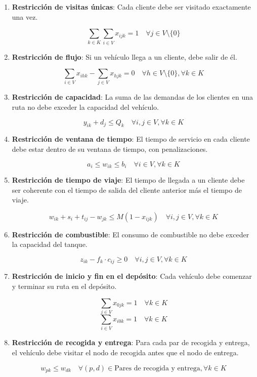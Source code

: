\documentclass{article}
\begin{document}
\begin{enumerate}
    \item \textbf{Restricción de visitas únicas}: Cada cliente debe ser visitado exactamente una vez.

    \[
    \sum_{k \in K} \sum_{i \in V} x_{ijk} = 1 \quad \forall j \in V \setminus \{0\}
    \]

    \item \textbf{Restricción de flujo}: Si un vehículo llega a un cliente, debe salir de él.

    \[
    \sum_{i \in V} x_{ihk} - \sum_{j \in V} x_{hjk} = 0 \quad \forall h \in V \setminus \{0\}, \forall k \in K
    \]

    \item \textbf{Restricción de capacidad}: La suma de las demandas de los clientes en una ruta no debe exceder la capacidad del vehículo.

    \[
    y_{ik} + d_j \leq Q_k \quad \forall i, j \in V, \forall k \in K
    \]

    \item \textbf{Restricción de ventana de tiempo}: El tiempo de servicio en cada cliente debe estar dentro de su ventana de tiempo, con penalizaciones.

    \[
    a_i \leq w_{ik} \leq b_i \quad \forall i \in V, \forall k \in K
    \]

    \item \textbf{Restricción de tiempo de viaje}: El tiempo de llegada a un cliente debe ser coherente con el tiempo de salida del cliente anterior más el tiempo de viaje.

    \[
    w_{ik} + s_i + t_{ij} - w_{jk} \leq M (1 - x_{ijk}) \quad \forall i, j \in V, \forall k \in K
    \]

    \item \textbf{Restricción de combustible}: El consumo de combustible no debe exceder la capacidad del tanque.

    \[
    z_{ik} - f_k \cdot c_{ij} \geq 0 \quad \forall i, j \in V, \forall k \in K
    \]

    \item \textbf{Restricción de inicio y fin en el depósito}: Cada vehículo debe comenzar y terminar su ruta en el depósito.

    \[
    \sum_{j \in V} x_{0jk} = 1 \quad \forall k \in K
    \]
    \[
    \sum_{i \in V} x_{i0k} = 1 \quad \forall k \in K
    \]

    \item \textbf{Restricción de recogida y entrega}: Para cada par de recogida y entrega, el vehículo debe visitar el nodo de recogida antes que el nodo de entrega.

    \[
    w_{pk} \leq w_{dk} \quad \forall (p, d) \in \text{Pares de recogida y entrega}, \forall k \in K
    \]
\end{enumerate}
\end{document}
